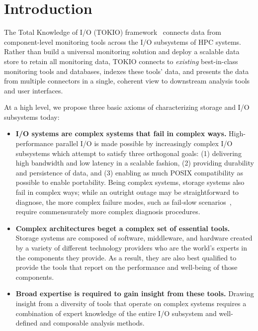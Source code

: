 \section{Introduction} \label{sec:intro}

The Total Knowledge of I/O (TOKIO) framework~\cite{Lockwood2017} connects data from component-level monitoring tools across the I/O subsystems of HPC systems.  Rather than build a universal monitoring solution and deploy a scalable data store to retain all monitoring data, TOKIO connects to \emph{existing} best-in-class monitoring tools and databases, indexes these tools' data, and presents the data from multiple connectors in a single, coherent view to downstream analysis tools and user interfaces.

At a high level, we propose three basic axioms of characterizing storage and I/O subsystems today:

\begin{itemize}[leftmargin=*]
\item \textbf{I/O systems are complex systems that fail in complex ways.}
High-performance parallel I/O is made possible by increasingly complex I/O subsystems which attempt to satisfy three orthogonal goals:
(1) delivering high bandwidth and low latency in a scalable fashion,
(2) providing durability and persistence of data, and
(3) enabling as much POSIX compatibility as possible to enable portability.
Being complex systems, storage systems also fail in complex ways;
while an outright outage may be straightforward to diagnose, the more complex failure modes, such as fail-slow scenarios~\cite{Gunawi2018}, require commensurately more complex diagnosis procedures.

\item \textbf{Complex architectures beget a complex set of essential tools.}
Storage systems are composed of software, middleware, and hardware created by a variety of different technology providers who are the world's experts in the components they provide.
As a result, they are also best qualified to provide the tools that report on the performance and well-being of those components.

\item \textbf{Broad expertise is required to gain insight from these tools.}
Drawing insight from a diversity of tools that operate on complex systems requires a combination of expert knowledge of the entire I/O subsystem and well-defined and composable analysis methods.
\end{itemize}

